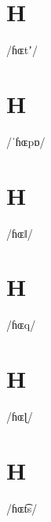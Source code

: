 \documentclass[10pt,a4paper,twoside]{book}
\begin{document}
\section*{H}

\begin{multicols}{3}
 {/ɦɶtʼ/} {}
\end{multicols}

\section*{H}

\begin{multicols}{3}
 {/ˈɦɶpɒ/} {}
\end{multicols}

\section*{H}

\begin{multicols}{3}
 {/ɦɶǁ/} {}
\end{multicols}

\section*{H}

\begin{multicols}{3}
 {/ɦɶq/} {}
\end{multicols}

\section*{H}

\begin{multicols}{3}
 {/ɦɶɭ/} {}
\end{multicols}

\section*{H}

\begin{multicols}{3}
 {/ɦɶt͡s/} {}
\end{multicols}
\end{document}
